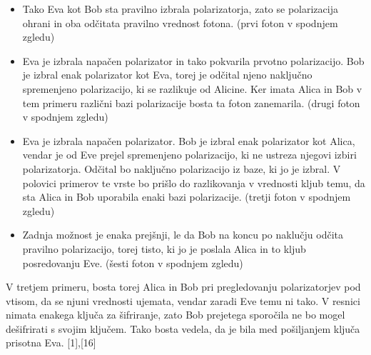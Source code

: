 \documentclass[A4paper, 11pt]{article}
\begin{document}
\begin{itemize}

\item Tako Eva kot Bob sta pravilno izbrala polarizatorja, zato se polarizacija ohrani in oba odčitata pravilno vrednost fotona. (prvi foton v spodnjem zgledu)

\item Eva je izbrala napačen polarizator in tako pokvarila prvotno polarizacijo. Bob je izbral enak polarizator kot Eva, torej je odčital njeno naključno spremenjeno polarizacijo, ki se razlikuje od Alicine. Ker imata Alica in Bob v tem primeru različni bazi polarizacije bosta ta foton zanemarila. (drugi foton v spodnjem zgledu)

\item Eva je izbrala napačen polarizator. Bob je izbral enak polarizator kot Alica, vendar je od Eve prejel spremenjeno polarizacijo, ki ne ustreza njegovi izbiri polarizatorja. Odčital bo naključno polarizacijo iz baze, ki jo je izbral. V polovici primerov te vrste bo prišlo do razlikovanja v vrednosti kljub temu, da sta Alica in Bob uporabila enaki bazi polarizacije. (tretji foton v spodnjem zgledu)

\item Zadnja možnost je enaka prejšnji, le da Bob na koncu po naklučju odčita pravilno polarizacijo, torej tisto, ki jo je poslala Alica in to kljub posredovanju Eve. (šesti foton v spodnjem zgledu)

\end{itemize}

V tretjem primeru, bosta torej Alica in Bob pri pregledovanju polarizatorjev pod vtisom, da se njuni vrednosti ujemata, vendar zaradi Eve temu ni tako. V resnici nimata enakega ključa za šifriranje, zato Bob prejetega sporočila ne bo mogel dešifrirati s svojim ključem. Tako bosta vedela, da je bila med pošiljanjem ključa prisotna Eva.  [1],[16]
\end{document}
